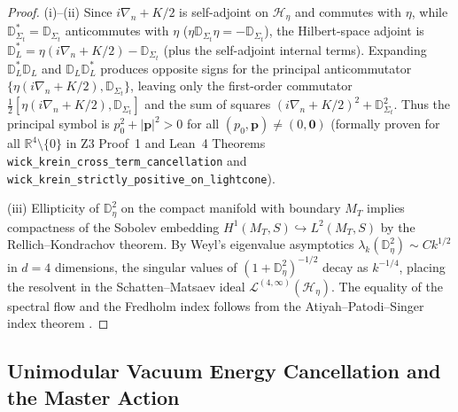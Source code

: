 \documentclass[11pt,a4paper]{article}
\theoremstyle{plain}
\theoremstyle{definition}
\theoremstyle{remark}
\newcommand{\Hilb}{\mathcal{H}}
\newcommand{\R}{\mathbb{R}}
\newcommand{\Dbb}{\mathbb{D}}
\begin{document}
\begin{proof}
(i)--(ii) Since $i\nabla_n + K/2$ is self-adjoint on $\Hilb_\eta$ and commutes with $\eta$, while $\Dbb_{\Sigma_t}^* = \Dbb_{\Sigma_t}$ anticommutes with $\eta$ ($\eta \Dbb_{\Sigma_t} \eta = -\Dbb_{\Sigma_t}$), the Hilbert-space adjoint is $\Dbb_L^* = \eta(i\nabla_n + K/2) - \Dbb_{\Sigma_t}$ (plus the self-adjoint internal terms). Expanding $\Dbb_L^* \Dbb_L$ and $\Dbb_L \Dbb_L^*$ produces opposite signs for the principal anticommutator $\{\eta(i\nabla_n + K/2), \Dbb_{\Sigma_t}\}$, leaving only the first-order commutator $\frac{1}{2}[\eta(i\nabla_n + K/2), \Dbb_{\Sigma_t}]$ and the sum of squares $(i\nabla_n + K/2)^2 + \Dbb_{\Sigma_t}^2$. Thus the principal symbol is $p_0^2 + |\mathbf{p}|^2 > 0$ for all $(p_0, \mathbf{p}) \neq (0,\mathbf{0})$ (formally proven for all $\R^4 \setminus \{0\}$ in Z3 Proof~1 and Lean~4 Theorems \texttt{wick\_\allowbreak krein\_\allowbreak cross\_\allowbreak term\_\allowbreak cancellation} and \texttt{wick\_\allowbreak krein\_\allowbreak strictly\_\allowbreak positive\_\allowbreak on\_\allowbreak lightcone}).

(iii) Ellipticity of $\Dbb_\eta^2$ on the compact manifold with boundary $M_T$ implies compactness of the Sobolev embedding $H^1(M_T, S) \hookrightarrow L^2(M_T, S)$ by the Rellich--Kondrachov theorem. By Weyl's eigenvalue asymptotics $\lambda_k(\Dbb_\eta^2) \sim C k^{1/2}$ in $d=4$ dimensions, the singular values of $(1+\Dbb_\eta^2)^{-1/2}$ decay as $k^{-1/4}$, placing the resolvent in the Schatten--Matsaev ideal $\mathcal{L}^{(4,\infty)}(\Hilb_\eta)$. The equality of the spectral flow and the Fredholm index follows from the Atiyah--Patodi--Singer index theorem \cite{AtiyahPatodiSinger1975}.
\end{proof}

\subsection{Unimodular Vacuum Energy Cancellation and the Master Action}
\end{document}
